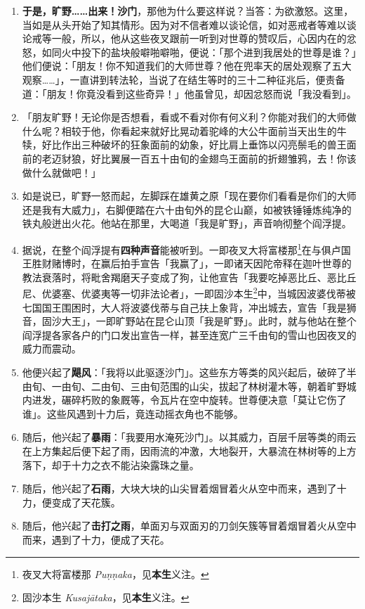 \begin{enumerate}\item \textbf{于是，旷野……出来！沙门}，那他为什么要这样说？当答：为欲激怒。这里，当如是从头开始了知其情形。因为对不信者难以谈论信，如对恶戒者等难以谈论戒等一般，所以，他从这些夜叉跟前一听到对世尊的赞叹后，心因内在的忿怒，如同火中投下的盐块般噼啪噼啪，便说：「那个进到我居处的世尊是谁？」他们便说：「朋友！你不知道我们的大师世尊？他在兜率天的居处观察了五大观察……」，一直讲到转法轮，当说了在结生等时的三十二种征兆后，便责备道：「朋友！你竟没看到这些奇异！」他虽曾见，却因忿怒而说「我没看到」。
\item 「朋友旷野！无论你是否想看，看或不看对你有何义利？你能对我们的大师做什么呢？相较于他，你看起来就好比晃动着驼峰的大公牛面前当天出生的牛犊，好比作出三种破坏的狂象面前的幼象，好比肩上垂饰以闪亮鬃毛的兽王面前的老迈豺狼，好比翼展一百五十由旬的金翅鸟王面前的折翅雏鸦，去！你该做什么就做吧！」
\item 如是说已，旷野一怒而起，左脚踩在雄黄之原「现在要你们看看是你们的大师还是我有大威力」，右脚便踏在六十由旬外的昆仑山巅，如被铁锤锤炼纯净的铁丸般迸出火花。他站在那里，大喝道「我是旷野」，声音响彻整个阎浮提。
\item 据说，在整个阎浮提有\textbf{四种声音}能被听到。一即夜叉大将富楼那\footnote{夜叉大将富楼那 \textit{Puṇṇaka}，见\textbf{本生}义注。}在与俱卢国王胜财赌博时，在赢后拍手宣告「我赢了」，一即诸天因陀帝释在迦叶世尊的教法衰落时，将毗舍羯磨天子变成了狗，让他宣告「我要吃掉恶比丘、恶比丘尼、优婆塞、优婆夷等一切非法论者」，一即固沙本生\footnote{固沙本生 \textit{Kusajātaka}，见\textbf{本生}义注。}中，当城因波婆伐蒂被七国国王围困时，大人将波婆伐蒂与自己扶上象背，冲出城去，宣告「我是狮音，固沙大王」，一即旷野站在昆仑山顶「我是旷野」。此时，就与他站在整个阎浮提各家各户的门口发出宣告一样，甚至连宽广三千由旬的雪山也因夜叉的威力而震动。
\item 他便兴起了\textbf{飓风}：「我将以此驱逐沙门」。这些东方等类的风兴起后，破碎了半由旬、一由旬、二由旬、三由旬范围的山尖，拔起了林树灌木等，朝着旷野城内进发，碾碎朽败的象厩等，令瓦片在空中旋转。世尊便决意「莫让它伤了谁」。这些风遇到十力后，竟连动摇衣角也不能够。
\item 随后，他兴起了\textbf{暴雨}：「我要用水淹死沙门」。以其威力，百层千层等类的雨云在上方集起后便下起了雨，因雨流的冲激，大地裂开，大暴流在林树等的上方落下，却于十力之衣不能沾染露珠之量。
\item 随后，他兴起了\textbf{石雨}，大块大块的山尖冒着烟冒着火从空中而来，遇到了十力，便变成了天花簇。
\item 随后，他兴起了\textbf{击打之雨}，单面刃与双面刃的刀剑矢簇等冒着烟冒着火从空中而来，遇到了十力，便成了天花。

\end{enumerate}
